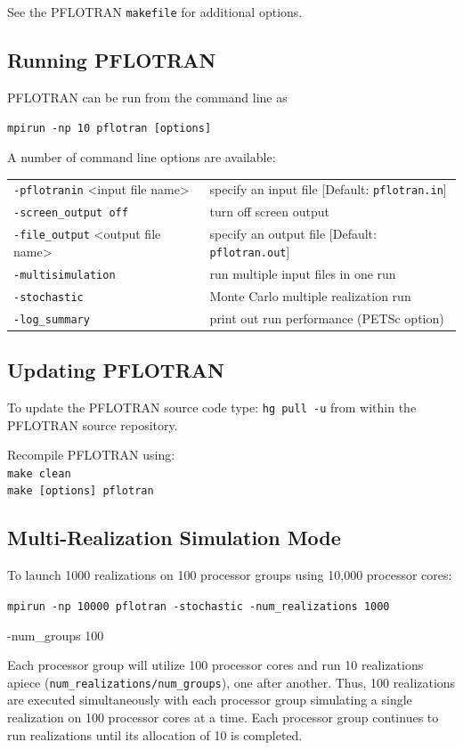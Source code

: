 \documentclass[12pt]{article}
\begin{document}
\noindent
See the PFLOTRAN \verb|makefile| for additional options.

\subsection{Running PFLOTRAN}

PFLOTRAN can be run from the command line as

\verb|mpirun -np 10 pflotran [options]|

A number of command line options are available:

\begin{tabular}{ll}
{\tt -pflotranin} <input file name> & specify an input file [Default: {\tt pflotran.in}]\\
{\tt -screen\_output off} & turn off screen output\\
{\tt -file\_output} <output file name> & specify an output file [Default: {\tt pflotran.out}]\\
{\tt -multisimulation} & run multiple input files in one run\\
{\tt -stochastic} & Monte Carlo multiple realization run\\
{\tt -log\_summary} & print out run performance (PETSc option)
\end{tabular}

\subsection*{Updating PFLOTRAN}

To update the PFLOTRAN source code
type: {\tt hg pull -u} from within the PFLOTRAN source repository.

\noindent
Recompile PFLOTRAN using:\\
\indent
{\tt make clean}\\
\indent
{\tt make [options] pflotran}

\subsection*{Multi-Realization Simulation Mode}

To launch 1000 realizations on 100 processor groups using 10,000 processor cores:

\noindent
{\tt mpirun -np 10000 pflotran -stochastic -num\_realizations 1000 

-num\_groups 100}

Each processor group will utilize 100 processor cores and run 10 realizations apiece \linebreak ({\tt num\_realizations/num\_groups}), one after another. Thus, 100 realizations are executed simultaneously with each processor group simulating a single realization on 100 processor cores at a time. Each processor group continues to run realizations until its allocation of 10 is completed.
\end{document}
